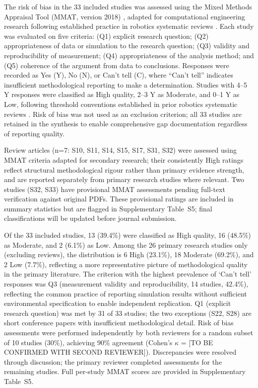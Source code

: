 \documentclass[review,3p,times]{elsarticle}
\begin{document}
The risk of bias in the 33 included studies was assessed using the Mixed Methods Appraisal Tool (MMAT, version 2018) \cite{hong2018}, adapted for computational engineering research following established practice in robotics systematic reviews \cite{brambilla2013}. Each study was evaluated on five criteria: (Q1) explicit research question; (Q2) appropriateness of data or simulation to the research question; (Q3) validity and reproducibility of measurement; (Q4) appropriateness of the analysis method; and (Q5) coherence of the argument from data to conclusions. Responses were recorded as Yes (Y), No (N), or Can't tell (C), where ``Can't tell'' indicates insufficient methodological reporting to make a determination. Studies with 4--5 Y responses were classified as High quality, 2--3 Y as Moderate, and 0--1 Y as Low, following threshold conventions established in prior robotics systematic reviews \cite{brambilla2013,bayindir2016}. Risk of bias was not used as an exclusion criterion; all 33 studies are retained in the synthesis to enable comprehensive gap documentation regardless of reporting quality.

Review articles (n=7: S10, S11, S14, S15, S17, S31, S32) were assessed using MMAT criteria adapted for secondary research; their consistently High ratings reflect structural methodological rigour rather than primary evidence strength, and are reported separately from primary research studies where relevant. Two studies (S32, S33) have provisional MMAT assessments pending full-text verification against original PDFs. These provisional ratings are included in summary statistics but are flagged in Supplementary Table~S5; final classifications will be updated before journal submission.

Of the 33 included studies, 13 (39.4\%) were classified as High quality, 16 (48.5\%) as Moderate, and 2 (6.1\%) as Low. Among the 26 primary research studies only (excluding reviews), the distribution is 6 High (23.1\%), 18 Moderate (69.2\%), and 2 Low (7.7\%), reflecting a more representative picture of methodological quality in the primary literature. The criterion with the highest prevalence of `Can't tell' responses was Q3 (measurement validity and reproducibility, 14 studies, 42.4\%), reflecting the common practice of reporting simulation results without sufficient environmental specification to enable independent replication. Q1 (explicit research question) was met by 31 of 33 studies; the two exceptions (S22, S28) are short conference papers with insufficient methodological detail. Risk of bias assessments were performed independently by both reviewers for a random subset of 10 studies (30\%), achieving 90\% agreement (Cohen's $\kappa$ = [TO BE CONFIRMED WITH SECOND REVIEWER]). Discrepancies were resolved through discussion; the primary reviewer completed assessments for the remaining studies. Full per-study MMAT scores are provided in Supplementary Table~S5.
\end{document}
